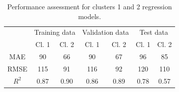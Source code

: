 \begin{table}[h]
    \centering
    {
    \begin{tabular}{c|c|c|c|c|c|c|}
      & \multicolumn{2}{c|}{Training data} & \multicolumn{2}{c|}{Validation data} & \multicolumn{2}{c|}{Test data} \\ \cline{2-7} 
      & Cl. 1            & Cl. 2           & Cl. 1             & Cl. 2            & Cl. 1          & Cl. 2         \\ \hline
    MAE   & 90               & 66              & 90                & 67               & 96             & 85            \\
    RMSE  & 115              & 91              & 116               & 92               & 120            & 110           \\
    $R^2$ & 0.87             & 0.90            & 0.86              & 0.89             & 0.78           & 0.57         
    \end{tabular}}
    \caption{Performance assessment for clusters 1 and 2 regression models.}
    \label{tab:08cluster1_cluster2_reg}
\end{table}

